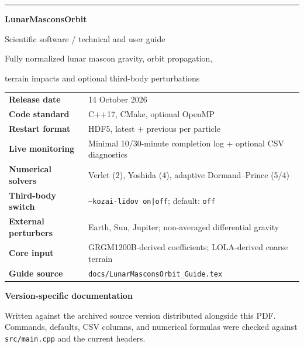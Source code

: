 \documentclass[11pt,a4paper]{article}
\newcommand{\opt}[1]{\texttt{#1}}
\newcommand{\pathcode}[1]{\nolinkurl{#1}}
\begin{document}
\thispagestyle{empty}
\vspace*{20mm}
{\color{teal}\rule{0.24\textwidth}{3.4pt}}\par\vspace{9mm}
{\fontsize{29}{34}\selectfont\bfseries\color{navy} LunarMasconsOrbit\par}
\vspace{4mm}
{\Large\color{slate}Scientific software / technical and user guide}\par
\vspace{9mm}
{\large Fully normalized lunar mascon gravity, orbit propagation,\par terrain impacts and optional third-body perturbations}\par
\vspace{14mm}
\begin{tcolorbox}[colback=light,colframe=line,boxrule=.5pt,arc=2mm]
\begin{tabularx}{\linewidth}{@{}>{\bfseries}l X@{}}
Release date & 14 October 2026\\
Code standard & C++17, CMake, optional OpenMP\\
Restart format & HDF5, latest + previous per particle\\
Live monitoring & Minimal 10/30-minute completion log + optional CSV diagnostics\\
Numerical solvers & Verlet (2), Yoshida (4), adaptive Dormand--Prince (5/4)\\
Third-body switch & \opt{--kozai-lidov on|off}; default: \opt{off}\\
External perturbers & Earth, Sun, Jupiter; non-averaged differential gravity\\
Core input & GRGM1200B-derived coefficients; LOLA-derived coarse terrain\\
Guide source & \pathcode{docs/LunarMasconsOrbit_Guide.tex}\\
\end{tabularx}
\end{tcolorbox}
\vfill
{\Large\bfseries\color{navy}Version-specific documentation}\par
{\color{slate}Written against the archived source version distributed alongside this PDF. Commands, defaults, CSV columns, and numerical formulas were checked against \pathcode{src/main.cpp} and the current headers.}\par
\newpage
{}
\tableofcontents
\clearpage
\end{document}
